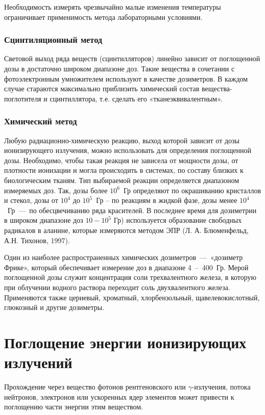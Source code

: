 \documentclass[a4paper, 14pt]{article}
\begin{document}
Необходимость измерять чрезвычайно малые изменения температуры ограничивает применимость метода лабораторными условиями.

\subsubsection{Сцинтиляционный метод}
Световой выход ряда веществ (сцинтилляторов) линейно зависит от поглощенной дозы в достаточно широком диапазоне доз. Такие вещества в сочетании с фотоэлектронным умножителем используют в качестве дозиметров. В каждом случае стараются максимально приблизить химический состав вещества-поглотителя и сцинтиллятора, т.е. сделать его «тканеэквивалентным».

\subsubsection{Химический метод}
Любую радиационно-химическую реакцию, выход которой зависит от дозы
ионизирующего излучения, можно использовать для определения поглощенной дозы.
Необходимо, чтобы такая реакция не зависела от мощности дозы, от плотности
ионизации и могла происходить в системах, по составу близких к биологическим
тканям. Тип выбираемой реакции определяется диапазоном измеряемых доз. Так, дозы
более $10^6$~Гр определяют по окрашиванию кристаллов и стекол, дозы от $10^4$ до $10^5$~Гр –
по реакциям в жидкой фазе, дозы менее $10^4$~Гр~---~по обесцвечиванию ряда красителей.
В последнее время для дозиметрии в широком диапазоне доз $10-10^5$ Гр) используется
образование свободных радикалов в аланине, которые измеряются методом ЭПР (Л.
А. Блюменфельд, А.Н. Тихонов, 1997).

Один из наиболее распространенных химических дозиметров~---~«дозиметр
Фрике», который обеспечивает измерение доз в диапазоне 4~--~400~Гр. Мерой поглощенной дозы
служит концентрация соли трехвалентного железа, в которую при облучении водного
раствора переходит соль двухвалентного железа. Применяются также цериевый,
хроматный, хлорбензольный, щавелевокислотный, глюкозный и другие дозиметры.

\section{Поглощение энергии ионизирующих излучений}
Прохождение через вещество фотонов рентгеновского или $\gamma$-излучения, потока
нейтронов, электронов или ускоренных ядер элементов может привести к поглощению
части энергии этим веществом.
\end{document}
